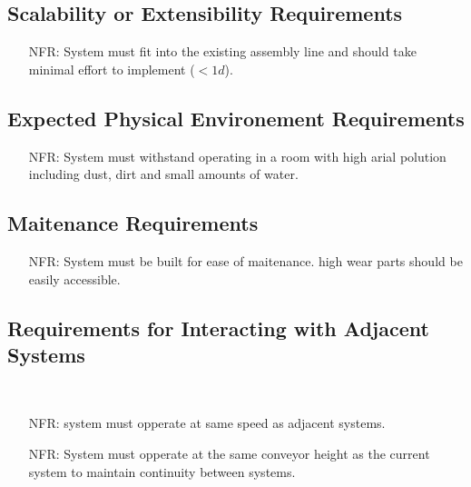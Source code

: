 \documentclass[12pt]{article}
\newcounter{nfrnum} %
\begin{document}
  \subsection{Scalability or Extensibility Requirements}
  \noindent \begin{itemize}
  \item[NFR\refstepcounter{nfrnum}\thenfrnum \label{NFR_Portability20}:]
  System must fit into the existing assembly line and should take minimal effort to implement ($<1d$).
  \end{itemize}


  \subsection{Expected Physical Environement Requirements}
  \noindent \begin{itemize}
  \item[NFR\refstepcounter{nfrnum}\thenfrnum \label{NFR_Portability13}:]
  System must withstand operating in a room with high arial polution including dust, dirt and small amounts of water.
  \end{itemize}
  \subsection{Maitenance Requirements}
  \noindent \begin{itemize}
  \item[NFR\refstepcounter{nfrnum}\thenfrnum \label{NFR_Portability14}:]
  System must be built for ease of maitenance. high wear parts should be easily accessible.
  \end{itemize}


  \subsection{Requirements for Interacting with Adjacent Systems }\
  \noindent \begin{itemize}
  \item[NFR\refstepcounter{nfrnum}\thenfrnum \label{NFR_Portability15}:]
  system must opperate at same speed as adjacent systems.
  
  \item[NFR\refstepcounter{nfrnum}\thenfrnum \label{NFR_Portability16}:]
  System must opperate at the same conveyor height as the current system to maintain continuity between systems.
  
  \end{itemize}
\end{document}
